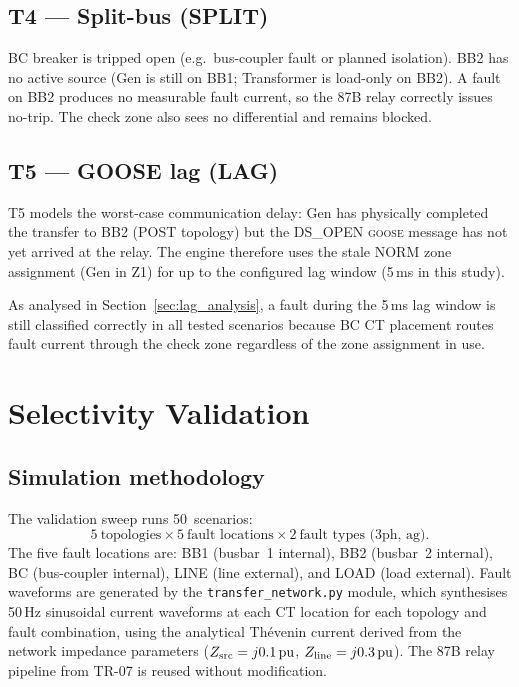 \documentclass[11pt,a4paper]{article}
\newcommand{\pu}{\,\text{pu}}
\newcommand{\goose}{\textsc{goose}}
\begin{document}
\subsection{T4 --- Split-bus (SPLIT)}

BC breaker is tripped open (e.g.\ bus-coupler fault or planned isolation).
BB2 has no active source (Gen is still on BB1; Transformer is load-only
on BB2).  A fault on BB2 produces no measurable fault current, so the 87B
relay correctly issues no-trip.  The check zone also sees no differential
and remains blocked.

\subsection{T5 --- GOOSE lag (LAG)}

T5 models the worst-case communication delay: Gen has physically completed
the transfer to BB2 (POST topology) but the DS\_OPEN \goose{} message has
not yet arrived at the relay.  The engine therefore uses the stale NORM
zone assignment (Gen in Z1) for up to the configured lag window
(5\,ms in this study).

As analysed in Section~\ref{sec:lag_analysis}, a fault during the 5\,ms
lag window is still classified correctly in all tested scenarios because BC
CT placement routes fault current through the check zone regardless of the
zone assignment in use.

\section{Selectivity Validation}
\label{sec:selectivity}

\subsection{Simulation methodology}

The validation sweep runs 50~scenarios:
\[
  5~\text{topologies} \times 5~\text{fault locations}
  \times 2~\text{fault types (3ph, ag)}.
\]
The five fault locations are: BB1 (busbar~1 internal), BB2 (busbar~2
internal), BC (bus-coupler internal), LINE (line external), and LOAD
(load external).  Fault waveforms are generated by the
\texttt{transfer\_network.py} module, which synthesises 50\,Hz sinusoidal
current waveforms at each CT location for each topology and fault
combination, using the analytical Th\'evenin current derived from the
network impedance parameters ($Z_{\rm src} = j0.1\pu$,
$Z_{\rm line} = j0.3\pu$).  The 87B relay pipeline from TR-07 is reused
without modification.
\end{document}
